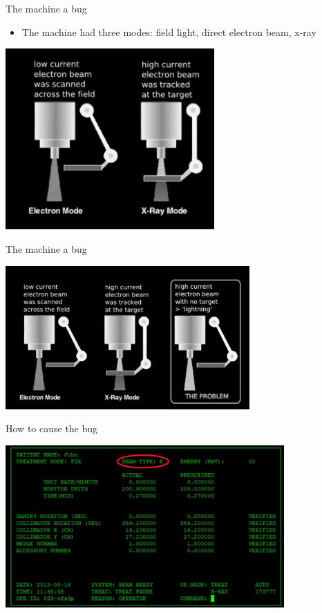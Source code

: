 \documentclass[presentation]{beamer}
\begin{document}
\begin{frame}[label={sec:orgb3b33c2}]{The machine a bug}
\begin{itemize}
\item The machine had three modes: field light, direct electron beam, x-ray
\end{itemize}

\begin{center}
\includegraphics[width=0.6\textwidth]{./beam.png}
\end{center}
\end{frame}
\begin{frame}[label={sec:org8b12509}]{The machine a bug}
\begin{center}
\includegraphics[width=0.7\textwidth]{./change.png}
\end{center}
\end{frame}
\begin{frame}[label={sec:orgb7c6d77}]{How to cause the bug}
\begin{center}
\includegraphics[width=0.8\textwidth]{./mistake.png}
\end{center}
\end{frame}
\end{document}
